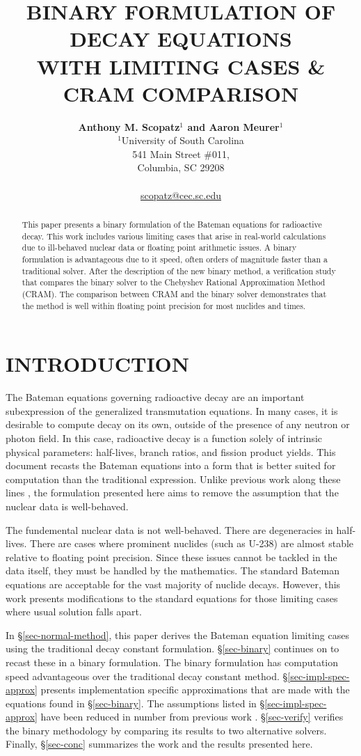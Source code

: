 \documentclass[letterpaper]{physor2018}
\title{BINARY FORMULATION OF DECAY EQUATIONS \\
       WITH LIMITING CASES \& CRAM COMPARISON}
\author{%
  \textbf{Anthony M. Scopatz$^1$ and Aaron Meurer$^1$}\\
  $^1$University of South Carolina \\
  541 Main Street \#011, \\
  Columbia, SC 29208 \\
  \\
  \url{scopatz@cec.sc.edu}
}
\begin{document}
\maketitle
\justify

\begin{abstract}
This paper presents a binary formulation of the Bateman equations
for radioactive decay. This work includes various limiting cases
that arise in real-world calculations due to ill-behaved nuclear data
or floating point arithmetic issues. A binary formulation is advantageous
due to it speed, often orders of magnitude faster than a traditional solver.
After the description of the new binary method,
a verification study that compares the binary solver
to the Chebyshev Rational Approximation Method (CRAM). The comparison
between CRAM and the binary solver demonstrates that the method is
well within floating point precision for most nuclides and times.
\end{abstract}

\section{INTRODUCTION}
\label{sec-intro}
The Bateman equations \cite{bateman1910solution} governing radioactive decay are an
important subexpression
of the generalized transmutation equations. In many cases, it is desirable to compute
decay on its own, outside of the presence of any neutron or photon field. In this
case, radioactive decay is a function solely of intrinsic physical parameters:
half-lives, branch ratios, and fission product yields. This document recasts the
Bateman equations into a form that is better suited for computation than
the traditional expression. Unlike previous work along these lines
\cite{scopatz2015decay}, the formulation presented here aims to remove the
assumption that the nuclear data is well-behaved.

The fundemental nuclear data is not well-behaved. There are degeneracies in
half-lives. There are cases where prominent nuclides (such as U-238) are
almost stable relative to floating point precision. Since these issues
cannot be tackled in the data itself, they must be handled by the
mathematics. The standard Bateman equations are acceptable for the
vast majority of nuclide decays. However, this work presents modifications
to the standard equations for those limiting cases where usual solution
falls apart.

In \S\ref{sec-normal-method}, this paper derives the Bateman equation
limiting cases using the traditional decay constant formulation.
\S\ref{sec-binary} continues on to recast these in a binary formulation.
The binary formulation has computation speed advantageous over the
traditional decay constant method. \S\ref{sec-impl-spec-approx} presents implementation
specific approximations that are made with the equations found in
\S\ref{sec-binary}. The assumptions listed in \S\ref{sec-impl-spec-approx}
have been reduced in number from previous work \cite{scopatz2015decay}.
\S\ref{sec-verify} verifies the binary methodology by comparing its
results to two alternative solvers. Finally, \S\ref{sec-conc} summarizes
the work and the results presented here.
\end{document}
